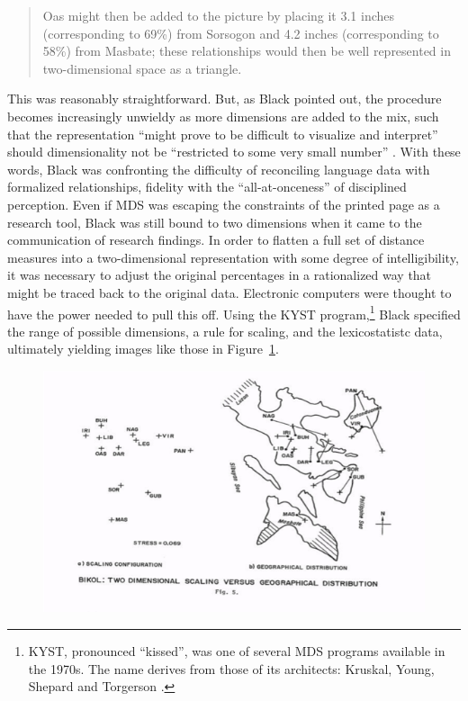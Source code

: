 \documentclass[output=paper]{langscibook}
\begin{document}
\begin{quotation}
Oas might then be added to the picture by placing it 3.1 inches (corresponding to 69\%) from Sorsogon and 4.2 inches (corresponding to 58\%) from Masbate; these relationships would then be well represented in two-dimensional space as a triangle. \citep[52]{Black1973}
\end{quotation}

This was reasonably straightforward. But, as Black pointed out, the procedure becomes increasingly unwieldy as more dimensions are added to the mix, such that the representation ``might prove to be difficult to visualize and interpret'' should dimensionality not be ``restricted to some very small number'' \citep[53]{Black1973}. With these words, Black was confronting the difficulty of reconciling language data with formalized relationships, fidelity with the ``all-at-onceness'' of disciplined perception. Even if MDS was escaping the constraints of the printed page as a research tool, Black was still bound to two dimensions when it came to the communication of research findings. In order to flatten a full set of distance measures into a two-dimensional representation with some degree of intelligibility, it was necessary to adjust the original percentages in a rationalized way that might be traced back to the original data. Electronic computers were thought to have the power needed to pull this off. Using the KYST program,\footnote{KYST, pronounced ``kissed'', was one of several MDS programs available in the 1970s. The name derives from those of its architects: Kruskal, Young, Shepard and Torgerson \citep[see][]{Kruskaletal1973}.} Black specified the range of possible dimensions, a rule for scaling, and the lexicostatistc data, ultimately yielding images like those in Figure~\ref{fig:kaplan:black1973}.

\begin{figure}
    \centering
    \includegraphics[scale=1]{figures/black1973.png}
    \caption{\citet{Black1973}}
    \label{fig:kaplan:black1973}
\end{figure}
\end{document}
